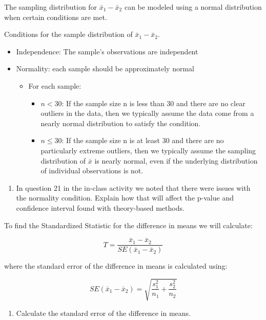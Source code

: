 \documentclass[
]{report}
\providecommand{\tightlist}{%
  \setlength{\itemsep}{0pt}\setlength{\parskip}{0pt}}
\begin{document}
The sampling distribution for \(\bar{x}_1-\bar{x}_2\) can be modeled using a normal distribution when certain conditions are met.

Conditions for the sample distribution of \(\bar{x}_1-\bar{x}_2\).

\begin{itemize}
\item
  Independence: The sample's observations are independent
\item
  Normality: each sample should be approximately normal

  \begin{itemize}
  \item
    For each sample:

    \begin{itemize}
    \item
      \(n < 30\): If the sample size n is less than 30 and there are no clear outliers in the data, then we typically assume the data come from a nearly normal distribution to satisfy the condition.
    \item
      \(n \le 30\): If the sample size n is at least 30 and there are no particularly extreme outliers, then we typically assume the sampling distribution of \(\bar{x}\) is nearly normal, even if the underlying distribution of individual observations is not.
    \end{itemize}
  \end{itemize}
\end{itemize}

\begin{enumerate}
\def\labelenumi{\arabic{enumi}.}
\tightlist
\item
  In question 21 in the in-class activity we noted that there were issues with the normality condition. Explain how that will affect the p-value and confidence interval found with theory-based methods.
\end{enumerate}

\vspace{1in}

To find the Standardized Statistic for the difference in means we will calculate:

\[T = \frac{\bar{x}_1-\bar{x}_2}{SE(\bar{x}_1-\bar{x}_2)}\]

where the standard error of the difference in means is calculated using:

\[SE(\bar{x}_1 -\bar{x}_2)=\sqrt{\frac{s_1^2}{n_1}+\frac{s_2^2}{n_2}}\]
\newpage

\begin{enumerate}
\def\labelenumi{\arabic{enumi}.}
\setcounter{enumi}{1}
\tightlist
\item
  Calculate the standard error of the difference in means.
\end{enumerate}
\end{document}
